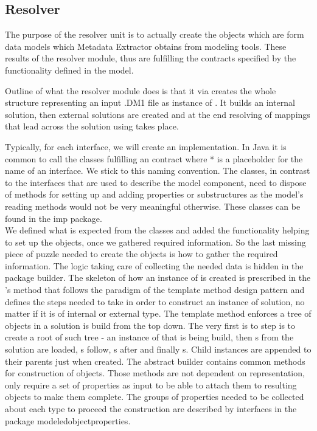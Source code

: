 \subsection{Resolver}

The purpose of the resolver unit is to actually create the objects which are form data models which Metadata Extractor obtains from modeling tools. These results of the resolver module, thus are fulfilling the contracts specified by the functionality defined in the model.

Outline of what the resolver module does is that it via  creates the whole structure representing an input .DM1 file as instance of . It builds an internal solution, then external solutions are created and at the end resolving of mappings that lead across the solution using  takes place.

Typically, for each interface, we will create an implementation. In Java it is common to call the classes fulfilling an contract  where * is a placeholder for the name of an interface. We stick to this naming convention. 
The  classes, in contrast to the interfaces that are used to describe the model component, need to dispose of methods for setting up and adding properties or substructures as the model's reading methods would not be very meaningful otherwise. These classes can be found in the imp package. \\

We defined what is expected from the classes and added the functionality helping to set up the objects, once we gathered required information.
So the last missing piece of puzzle needed to create the objects is how to gather the required information.
The logic taking care of collecting the needed data is hidden in the package builder.
The skeleton of how an instance of  is created is prescribed in the 's method  that follows the paradigm of the template method design pattern and defines the steps needed to take in order to construct an instance of  solution, no matter if it is of internal or external type.
The template method enforces a tree of objects in a solution is build from the top down.
The very first is to step is to create a root of such tree - an instance of  that is being build, then s from the solution are loaded, s follow, s after and finally s. 
Child instances are appended to their parents just when created.
The abstract builder contains common methods for construction of objects. Those methods are not dependent on representation, only require a set of properties as input to be able to attach them to resulting objects to make them complete. The groups of properties needed to be collected about each type to proceed the construction are described by interfaces in the package modeledobjectproperties.

